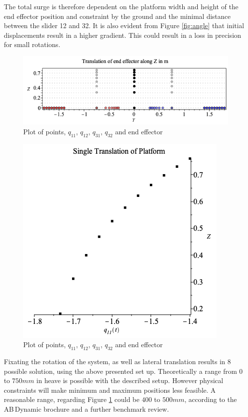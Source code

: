 The total surge is therefore dependent on the platform width and height of the end effector position and constraint by the ground and the minimal distance between the slider 12 and 32.
It is also evident from Figure \ref{fig:angle} that initial displacements result in a higher gradient. This  could result in a loss in precision for small rotations. 

\begin{figure}[h!]
  \centering
  \includegraphics[scale=0.5]{images/Heave_conf.png}
  \caption{Plot of points, $q_{11}$, $q_{12}$, $q_{31}$, $q_{32}$ and end effector
  \label{fig:heave_conf}}
\end{figure}

\begin{figure}[h!]
  \centering
  \includegraphics[scale=0.5]{images/Heave.png}
  \caption{Plot of points, $q_{11}$, $q_{12}$, $q_{31}$, $q_{32}$ and end effector
  \label{fig:heave}}
\end{figure}

Fixating the rotation of the system, as well as lateral translation results in 8 possible solution, using the above presented set up. Theoretically a range from $0$ to $750mm$ in heave is possible with the described setup. However physical constraints will make minimum and maximum positions less feasible. A reasonable range, regarding Figure \ref{fig:heave_conf} could be $400$ to $500mm$, according to the AB\,Dynamic brochure and a further benchmark review.

